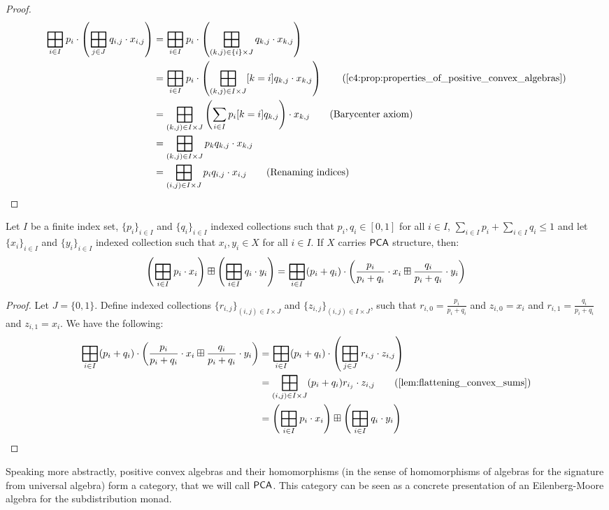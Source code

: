 \begin{proof}
    \begin{align*}
        \bigboxplus_{i \in I} p_i \cdot \left(\bigboxplus_{j \in J} q_{i,j} \cdot x_{i,j}\right) &= \bigboxplus_{i \in I} p_i \cdot \left(\bigboxplus_{(k,j) \in \{i\} \times J} q_{k,j} \cdot x_{k,j}\right) \\
        &= \bigboxplus_{i \in I} p_i \cdot \left(\bigboxplus_{(k,j) \in I \times J} [k = i]q_{k,j} \cdot x_{k,j}\right) \tag{\Cref{c4:prop:properties_of_positive_convex_algebras}} \\
        &= \bigboxplus_{(k,j) \in I \times J} \left(\sum_{i \in I} p_i [k=i]q_{k,j} \right) \cdot x_{k,j} \tag{Barycenter axiom} \\
        &= \bigboxplus_{(k,j) \in I \times J} p_k q_{k,j}  \cdot x_{k,j} \\
        &= \bigboxplus_{(i,j) \in I \times J} p_i q_{i,j}  \cdot x_{i,j} \tag{Renaming indices}\\
    \end{align*}
\end{proof}
\begin{lemma}\label{c4:lem:grouping_probabilities}
    Let $I$ be a finite index set, $\{p_i\}_{i \in I}$ and $\{q_i\}_{i \in I}$ indexed collections such that $p_i,q_i \in [0,1]$ for all $i \in I$, $\sum_{i \in I} p_i + \sum_{i \in I} q_i \leq 1$ and let $\{x_i\}_{i \in I}$ and $\{y_i\}_{i \in I}$ indexed collection such that $x_i, y_i \in X$ for all $i \in I$. If $X$ carries ${\mathsf{PCA}}$ structure, then:
    $$
    \left(\bigboxplus_{i \in I} p_i \cdot x_i\right) \boxplus\left(\bigboxplus_{i \in I} q_i \cdot y_i\right) = \bigboxplus_{i \in I} (p_i + q_i) \cdot \left(\frac{p_i}{p_i + q_i} \cdot x_i \boxplus \frac{q_i}{p_i + q_i} \cdot y_i \right)
    $$
\end{lemma}
\begin{proof}
    Let $J = \{0,1\}$. Define indexed collections $\{r_{i,j}\}_{(i,j) \in I \times J}$ and $\{z_{i,j}\}_{(i,j) \in I \times J}$, such that $r_{i,0} = \frac{p_i}{p_i + q_i}$ and $z_{i,0} = x_i$ and $r_{i,1} = \frac{q_i}{p_i + q_i}$ and $z_{i,1} = x_i$.
    We have the following:
    \begin{align*}
        \bigboxplus_{i \in I} (p_i + q_i) \cdot \left(\frac{p_i}{p_i + q_i} \cdot x_i \boxplus \frac{q_i}{p_i + q_i} \cdot y_i\right) &= \bigboxplus_{i \in I} (p_i + q_i) \cdot \left(\bigboxplus_{j \in J} r_{i,j} \cdot z_{i,j} \right) \\
        &= \bigboxplus_{(i,j) \in I \times J} (p_i + q_i)r_{i_j} \cdot z_{i,j} \tag{\Cref{lem:flattening_convex_sums}} \\
        &= \left(\bigboxplus_{i \in I} p_i \cdot x_{i}\right) \boxplus \left(\bigboxplus_{i \in I} q_i \cdot y_i\right)
    \end{align*}
\end{proof}
Speaking more abstractly, positive convex algebras and their homomorphisms (in the sense of homomorphisms of algebras for the signature from universal algebra) form a category, that we will call ${\mathsf{PCA}}$. This category can be seen as a concrete presentation of an Eilenberg-Moore algebra for the subdistribution monad.

